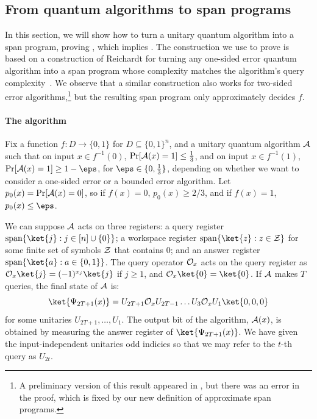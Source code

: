 \documentclass{toc}
\begin{document}
\subsection{From quantum algorithms to span programs}\label{sec:alg-to-span}

In this section, we will show how to turn a unitary quantum algorithm into a span program, proving , which implies . 
The construction we use to prove  is based on a construction of Reichardt for turning any one-sided error quantum algorithm into a span program whose complexity matches the algorithm's query complexity~\cite[arXiv version]{Rei09}. We observe that a similar construction also works for two-sided error algorithms,\footnote{A preliminary version of this result appeared in \cite{Jef14}, but there was an error in the proof, which is fixed by our new definition of approximate span programs.} but the resulting span program only approximately decides $f$. 

\paragraph{The algorithm} Fix a function $f:D\rightarrow \{0,1\}$ for $D\subseteq \{0,1\}^n$, and a unitary quantum algorithm ${\cal A}$ such that on input $x\in f^{-1}(0)$, $\Pr[{\cal A}(x)=1]\leq\frac{1}{3}$, and on input $x\in f^{-1}(1)$, $\Pr[{\cal A}(x)=1]\geq 1-\eps$, for $\eps\in\{0,\frac{1}{3}\}$, depending on whether we want to consider a one-sided error or a bounded error algorithm. Let $p_0(x)=\Pr[{\cal A}(x)=0]$, so if $f(x)=0$, $p_0(x)\geq 2/3$, and if $f(x)=1$, $p_0(x)\leq \eps$. 

We can suppose ${\cal A}$ acts on three registers: a query register $\mathrm{span}\{\ket{j}:j\in[n]\cup\{0\}\}$; a workspace register $\mathrm{span}\{\ket{z}:z\in{\cal Z}\}$ for some finite set of symbols ${\cal Z}$ that contains 0; and an answer register $\mathrm{span}\{\ket{a}:a\in\{0,1\}\}$. The query operator ${\cal O}_x$ acts on the query register as ${\cal O}_x\ket{j}=(-1)^{x_j}\ket{j}$ if $j\geq 1$, and ${\cal O}_x\ket{0}=\ket{0}$. If ${\cal A}$ makes $T$ queries, the final state of ${\cal A}$ is: 
$$\ket{\Psi_{2T+1}(x)}=U_{2T+1}{\cal O}_x U_{2T-1}\dots U_3{\cal O}_x U_1\ket{0,0,0}$$
for some unitaries $U_{2T+1},\dots,U_1$. The output bit of the algorithm, ${\cal A}(x)$, is obtained by measuring the answer register of $\ket{\Psi_{2T+1}(x)}$.  We have given the input-independent unitaries odd indicies so that we may refer to the $t$-th query as $U_{2t}$. 
\end{document}
